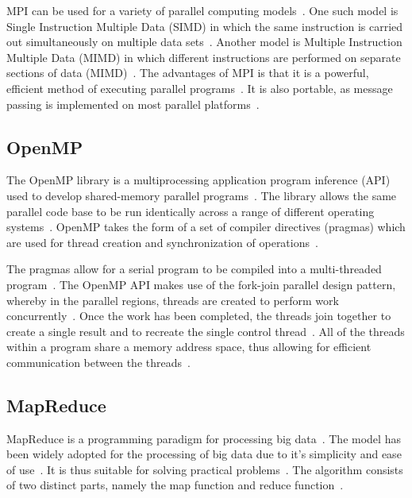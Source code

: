 \documentclass[12pt,twocolumn]{witseiepaper}
\begin{document}
MPI can be used for a variety of parallel computing models~\cite{comparingMPIMapReduce}. One such model is Single Instruction Multiple Data (SIMD) in which the same instruction is carried out simultaneously on multiple data sets~\cite{comparingMPIMapReduce}. Another model is Multiple Instruction Multiple Data (MIMD) in which different instructions are performed on separate sections of data (MIMD)~\cite{comparingMPIMapReduce}. The advantages of MPI is that it is a powerful, efficient method of executing parallel programs~\cite{IBM}. It is also portable, as message passing is implemented on most parallel platforms~\cite{IBM}.

\subsection{OpenMP}

The OpenMP library is a multiprocessing application program inference (API) used to develop shared-memory parallel programs~\cite{comparingMPIMapReduce}. The library allows the same parallel code base to be run identically across a range of different operating systems~\cite{comparingMPIMapReduce}. OpenMP takes the form of a set of compiler directives (pragmas) which are used for thread creation and synchronization of operations~\cite{comparingMPIMapReduce}. 

The pragmas allow for a serial program to be compiled into a multi-threaded program~\cite{kuhn2000openmp}. The OpenMP API makes use of the fork-join parallel design pattern, whereby in the parallel regions, threads are created to perform work concurrently~\cite{openMP}. Once the work has been completed, the threads join together to create a single result and to recreate the single control thread~\cite{openMP}. All of the threads within a program share a memory address space, thus allowing for efficient communication between the threads~\cite{comparingMPIMapReduce}. 

\subsection{MapReduce}

MapReduce is a programming paradigm for processing big data~\cite{comparingMPIMapReduce}. The model has been widely adopted for the processing of big data due to it's simplicity and ease of use~\cite{comparingMPIMapReduce}. It is thus suitable for solving practical problems~\cite{comparingMPIMapReduce, mapReduceJoin}. The algorithm consists of two distinct parts, namely the map function and reduce function~\cite{phoenix}. 
\end{document}
